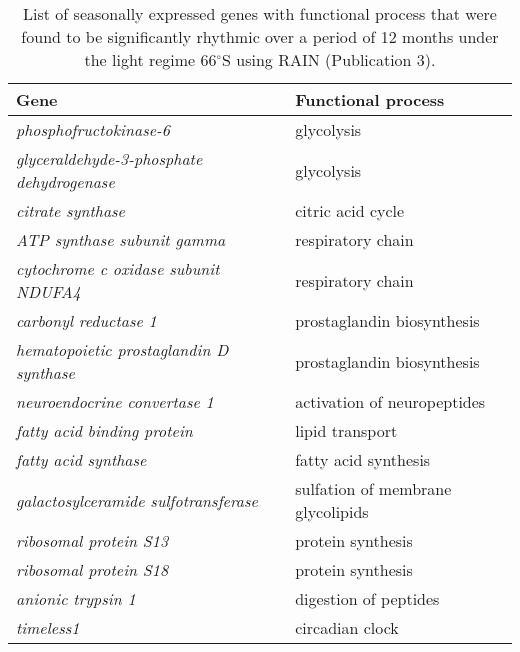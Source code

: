 \begin{table}[]
\centering
\caption{List of seasonally expressed genes with functional process that were
found to be significantly rhythmic over a period of 12 months under the light
regime 66$^{\circ}$S using RAIN (Publication 3).}
\label{discussion_table_1}
{\scriptsize
\begin{tabular}{@{}ll@{}}
\toprule
\textbf{Gene}                                     & \textbf{Functional process}       \\ \midrule
\textit{phosphofructokinase-6}                    & glycolysis                        \\
\textit{glyceraldehyde-3-phosphate dehydrogenase} & glycolysis                        \\
\textit{citrate synthase}                         & citric acid cycle                 \\
\textit{ATP synthase subunit gamma}               & respiratory chain                 \\
\textit{cytochrome c oxidase subunit NDUFA4}      & respiratory chain                 \\
\textit{carbonyl reductase 1}                     & prostaglandin biosynthesis        \\
\textit{hematopoietic prostaglandin D synthase}   & prostaglandin biosynthesis        \\
\textit{neuroendocrine convertase 1}              & activation of neuropeptides       \\
\textit{fatty acid binding protein}               & lipid transport                   \\
\textit{fatty acid synthase}                      & fatty acid synthesis              \\
\textit{galactosylceramide sulfotransferase}      & sulfation of membrane glycolipids \\
\textit{ribosomal protein S13}                    & protein synthesis                 \\
\textit{ribosomal protein S18}                    & protein synthesis                 \\
\textit{anionic trypsin 1}                        & digestion of peptides             \\
\textit{timeless1}                                & circadian clock                   \\ \bottomrule
\end{tabular}%
}
\end{table}

